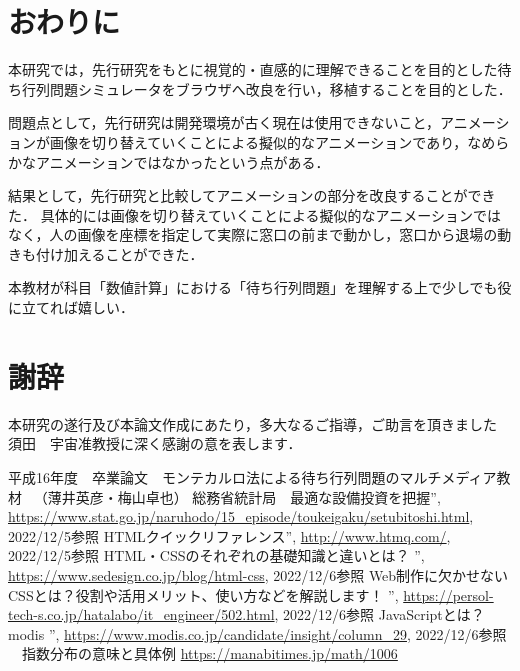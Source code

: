 \documentclass[12pt,a4j]{ltjsarticle}
\begin{document}
\clearpage


\section{おわりに}
本研究では，先行研究をもとに視覚的・直感的に理解できることを目的とした待ち行列問題シミュレータをブラウザへ改良を行い，移植することを目的とした．

問題点として，先行研究は開発環境が古く現在は使用できないこと，アニメーションが画像を切り替えていくことによる擬似的なアニメーションであり，なめらかなアニメーションではなかったという点がある．

結果として，先行研究と比較してアニメーションの部分を改良することができた．
具体的には画像を切り替えていくことによる擬似的なアニメーションではなく，人の画像を座標を指定して実際に窓口の前まで動かし，窓口から退場の動きも付け加えることができた．

本教材が科目「数値計算」における「待ち行列問題」を理解する上で少しでも役に立てれば嬉しい．

\clearpage

\section{謝辞}
本研究の遂行及び本論文作成にあたり，多大なるご指導，ご助言を頂きました  須田　宇宙准教授に深く感謝の意を表します．
\clearpage

\begin{thebibliography}{99}
平成16年度　卒業論文　モンテカルロ法による待ち行列問題のマルチメディア教材 　（薄井英彦・梅山卓也）
 総務省統計局　最適な設備投資を把握”, \url{https://www.stat.go.jp/naruhodo/15_episode/toukeigaku/setubitoshi.html}, 2022/12/5参照
 HTMLクイックリファレンス”, \url{http://www.htmq.com/}, 2022/12/5参照
HTML・CSSのそれぞれの基礎知識と違いとは？ ”, \url{https://www.sedesign.co.jp/blog/html-css}, 2022/12/6参照
Web制作に欠かせないCSSとは？役割や活用メリット、使い方などを解説します！ ”, \url{https://persol-tech-s.co.jp/hatalabo/it_engineer/502.html}, 2022/12/6参照
JavaScriptとは？　modis ”, \url{https://www.modis.co.jp/candidate/insight/column_29}, 2022/12/6参照
　指数分布の意味と具体例 \url{https://manabitimes.jp/math/1006}
\end{thebibliography}
\end{document}
